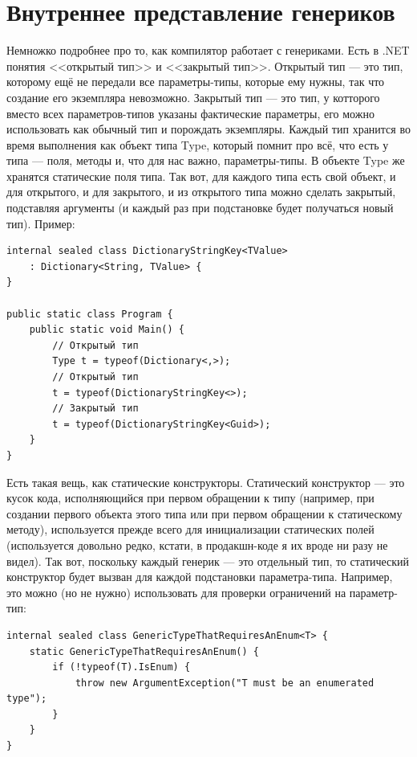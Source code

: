 \documentclass[a5paper]{article}
\begin{document}
\section{Внутреннее представление генериков}

Немножко подробнее про то, как компилятор работает с генериками. Есть в .NET понятия <<открытый тип>> и <<закрытый тип>>. Открытый тип --- это тип, которому ещё не передали все параметры-типы, которые ему нужны, так что создание его экземпляра невозможно. Закрытый тип --- это тип, у котторого вместо всех параметров-типов указаны фактические параметры, его можно использовать как обычный тип и порождать экземпляры. Каждый тип хранится во время выполнения как объект типа Type, который помнит про всё, что есть у типа --- поля, методы и, что для нас важно, параметры-типы. В объекте Type же хранятся статические поля типа. Так вот, для каждого типа есть свой объект, и для открытого, и для закрытого, и из открытого типа можно сделать закрытый, подставляя аргументы (и каждый раз при подстановке будет получаться новый тип). Пример:

\begin{verbatim}
internal sealed class DictionaryStringKey<TValue>
    : Dictionary<String, TValue> {
}

public static class Program {
    public static void Main() {
        // Открытый тип
        Type t = typeof(Dictionary<,>);
        // Открытый тип
        t = typeof(DictionaryStringKey<>);
        // Закрытый тип
        t = typeof(DictionaryStringKey<Guid>);
    }
}
\end{verbatim}

Есть такая вещь, как статические конструкторы. Статический конструктор --- это кусок кода, исполняющийся при первом обращении к типу (например, при создании первого объекта этого типа или при первом обращении к статическому методу), используется прежде всего для инициализации статических полей (используется довольно редко, кстати, в продакшн-коде я их вроде ни разу не видел). Так вот, поскольку каждый генерик --- это отдельный тип, то статический конструктор будет вызван для каждой подстановки параметра-типа. Например, это можно (но не нужно) использовать для проверки ограничений на параметр-тип:

\begin{verbatim}
internal sealed class GenericTypeThatRequiresAnEnum<T> {
    static GenericTypeThatRequiresAnEnum() {
        if (!typeof(T).IsEnum) {
            throw new ArgumentException("T must be an enumerated type");
        }
    }
}
\end{verbatim}
\end{document}
